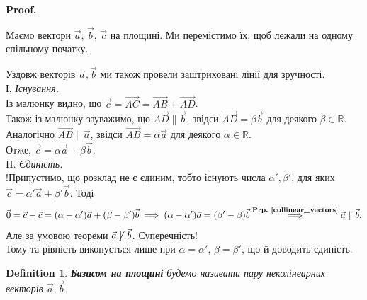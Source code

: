 \documentclass[a4paper, 10pt]{extarticle}
\makeatletter
\def\qed{$\blacksquare$}
\newcommand\prpref[1]{\textbf{Prp.~\ref{#1}}}
\def\qed{$\blacksquare$}
\theoremstyle{theoremdd}
\theoremstyle{theoremdd}
\newtheorem{definition}[theorem]{Definition}
\theoremstyle{theoremdd}
\theoremstyle{theoremdd}
\theoremstyle{theoremdd}
\theoremstyle{theoremdd}
\theoremstyle{theoremdd}
\theoremstyle{theoremdd}
\renewenvironment{proof}[1][Proof.\\]{\par
\pushQED{\hfill \qed}%
\normalfont \topsep6\p@\@plus6\p@\relax
\trivlist
\item\relax
{\bfseries
#1\@addpunct{.}}\hspace\labelsep\ignorespaces
}{%
\popQED\endtrivlist\@endpefalse
}
\makeatother
\begin{document}
\begin{proof}
	Маємо вектори $\vec{a}$, $\vec{b}$, $\vec{c}$ на площині. Ми перемістимо їх, щоб лежали на одному спільному початку.
\begin{figure}[H]
\centering
\end{figure}
	Уздовж векторів $\vec{a},\vec{b}$ ми також провели заштриховані лінії для зручності.\\
І. \textit{Існування.}\\
	Із малюнку видно, що $\vec{c} = \overrightarrow{AC} = \overrightarrow{AB} + \overrightarrow{AD}$.\\
	Також із малюнку зауважимо, що $\overrightarrow{AD} \parallel \vec{b}$, звідси $\overrightarrow{AD} = \beta \vec{b}$ для деякого $\beta \in \mathbb{R}$. Аналогічно $\overrightarrow{AB} \parallel \vec{a}$, звідси $\overrightarrow{AB} = \alpha \vec{a}$ для деякого $\alpha \in \mathbb{R}$.\\
	Отже, $\vec{c} = \alpha \vec{a} + \beta \vec{b}$.
\bigskip \\
II. \textit{Єдиність.}\\
!Припустимо, що розклад не є єдиним, тобто існують числа $\alpha', \beta'$, для яких $\vec{c} = \alpha' \vec{a} + \beta' \vec{b}$. Тоді 
\[
\vec{0} = \vec{c} - \vec{c} = (\alpha-\alpha') \vec{a} + (\beta - \beta') \vec{b} \implies (\alpha-\alpha')\vec{a} = (\beta' - \beta)\vec{b} \overset{\textrm{\prpref{collinear_vectors}}}{\implies} \vec{a} \parallel \vec{b}.
\]
	Але за умовою теореми $\vec{a} \centernot\parallel \vec{b}$. Суперечність!\\ Тому та рівність виконується лише при $\alpha = \alpha'$, $\beta = \beta'$, що й доводить єдиність.
\end{proof}

\begin{definition}
\textbf{Базисом на площині} будемо називати пару неколінеарних векторів $\vec{a},\vec{b}$.
\end{definition}
\end{document}
